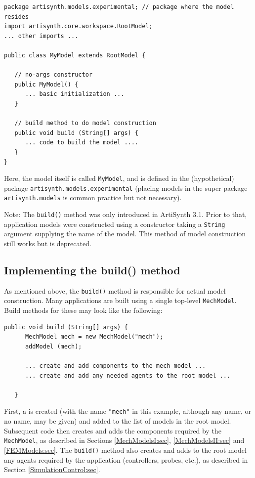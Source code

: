 \begin{lstlisting}[]
package artisynth.models.experimental; // package where the model resides
import artisynth.core.workspace.RootModel;
... other imports ...

public class MyModel extends RootModel {

   // no-args constructor
   public MyModel() {
      ... basic initialization ...
   }

   // build method to do model construction
   public void build (String[] args) {
      ... code to build the model ....
   }
}
\end{lstlisting}
Here, the model itself is called {\tt MyModel}, and is defined in the
(hypothetical) 
package {\tt artisynth.models.experimental} (placing models in the super
package {\tt artisynth.models} is common practice but not
necessary).

\begin{sideblock}
Note: The {\tt build()} method was only introduced in ArtiSynth
3.1. Prior to that, application models were constructed using a
constructor taking a {\tt String} argument supplying the name of the
model. This method of model construction still works but is
deprecated.
\end{sideblock}

\subsection{Implementing the build() method}

As mentioned above, the {\tt build()} method is responsible for actual
model construction.  Many applications are built using a single
top-level {\tt MechModel}.  Build methods for these may look
like the following:
\begin{lstlisting}[]
   public void build (String[] args) {
      MechModel mech = new MechModel("mech");
      addModel (mech);

      ... create and add components to the mech model ...
      ... create and add any needed agents to the root model ...

   }
\end{lstlisting}
First, a  is created
(with the name {\tt "mech"} in this example, although any name, or no
name, may be given) and added to the list of models in the root
model. Subsequent code then creates and adds the components required
by the {\tt MechModel}, as described in Sections
\ref{MechModelsI:sec}, \ref{MechModelsII:sec} and \ref{FEMModels:sec}.
The {\tt build()} method also creates and adds to the root model any
agents required by the application (controllers, probes, etc.), as
described in Section \ref{SimulationControl:sec}.

